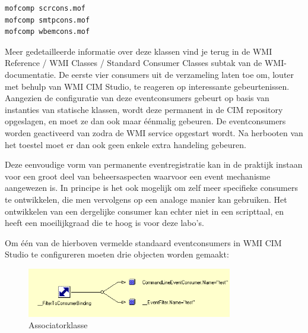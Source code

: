\documentclass[11pt,a4paper]{report}
\begin{document}
\begin{lstlisting}
mofcomp scrcons.mof
mofcomp smtpcons.mof
mofcomp wbemcons.mof
\end{lstlisting}
Meer gedetailleerde informatie over deze klassen vind je terug in de WMI Reference / WMI Classes / Standard Consumer Classes subtak van de WMI-documentatie. De eerste vier consumers uit de verzameling laten toe om, louter met behulp van WMI CIM Studio, te reageren op interessante gebeurtenissen. Aangezien de configuratie van deze eventconsumers gebeurt op basis van instanties van statische klassen, wordt deze permanent in de CIM repository opgeslagen, en moet ze dan ook maar éénmalig gebeuren. De eventconsumers worden geactiveerd van zodra de WMI service opgestart wordt. Na herbooten van het toestel moet er dan ook geen enkele extra handeling gebeuren. 
\par Deze eenvoudige vorm van permanente eventregistratie kan in de praktijk instaan voor een groot deel van beheersaspecten waarvoor een event mechanisme aangewezen is. In principe is het ook mogelijk om zelf meer specifieke consumers te ontwikkelen, die men vervolgens op een analoge manier kan gebruiken. Het ontwikkelen van een dergelijke consumer kan echter niet in een scripttaal, en heeft een moeilijkgraad die te hoog is voor deze labo's.

\par Om één van de hierboven vermelde standaard eventconsumers in WMI CIM Studio te configureren moeten drie objecten worden gemaakt:
\begin{figure}[h]
	\caption{Associatorklasse}
	\centering
	\includegraphics[width=0.8\textwidth]{afbeeldingen/PermanenteEventRegistratie.png}
\end{figure}
\end{document}
